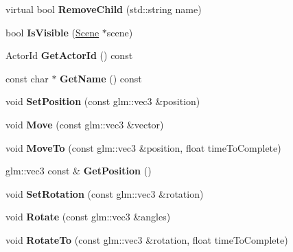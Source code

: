 \begin{DoxyCompactItemize}
virtual bool {\bfseries Remove\+Child} (std\+::string name)
\item 
\mbox{\label{classTarbora_1_1SceneNode_a02c5943ff54794c5db8ea1f644d3ddc2}} 
bool {\bfseries Is\+Visible} (\hyperlink{classTarbora_1_1Scene}{Scene} $\ast$scene)
\item 
\mbox{\label{classTarbora_1_1SceneNode_a377a382bd929d0c8d1bc56c147826613}} 
Actor\+Id {\bfseries Get\+Actor\+Id} () const
\item 
\mbox{\label{classTarbora_1_1SceneNode_a5f89f19eed21c23d2adf7ccad61fef3b}} 
const char $\ast$ {\bfseries Get\+Name} () const
\item 
\mbox{\label{classTarbora_1_1SceneNode_a9bb7bb3d0bdca07d9e2e0d2e77607971}} 
void {\bfseries Set\+Position} (const glm\+::vec3 \&position)
\item 
\mbox{\label{classTarbora_1_1SceneNode_a31e4d5450df32c9cde88787921e04abc}} 
void {\bfseries Move} (const glm\+::vec3 \&vector)
\item 
\mbox{\label{classTarbora_1_1SceneNode_a0978f3bb0b9fdf9c7cda4caafc00f8ca}} 
void {\bfseries Move\+To} (const glm\+::vec3 \&position, float time\+To\+Complete)
\item 
\mbox{\label{classTarbora_1_1SceneNode_afa27e6df0d90e53ebecebda9602033d6}} 
glm\+::vec3 const  \& {\bfseries Get\+Position} ()
\item 
\mbox{\label{classTarbora_1_1SceneNode_a43bfc3aacb1b1f52ad2bfeab360c66fd}} 
void {\bfseries Set\+Rotation} (const glm\+::vec3 \&rotation)
\item 
\mbox{\label{classTarbora_1_1SceneNode_a7a9d38d19a94a9a7e31cf056ddf9cc8c}} 
void {\bfseries Rotate} (const glm\+::vec3 \&angles)
\item 
\mbox{\label{classTarbora_1_1SceneNode_a2688baa972fb56addfc0b906a45a900c}} 
void {\bfseries Rotate\+To} (const glm\+::vec3 \&rotation, float time\+To\+Complete)

\end{DoxyCompactItemize}
